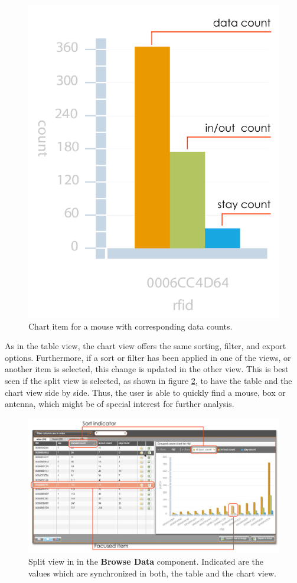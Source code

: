 \begin{figure}[!htbp]
\begin{center}
  \includegraphics[width=.33\textwidth]{assets/pdf/mouse_chart_item.pdf}
  \caption[Chart item for a mouse with corresponding data counts]{Chart item for a mouse with corresponding data counts.}
  \label{fig:mouse_chart_item}
\end{center}
\end{figure}

As in the table view, the chart view offers the same sorting, filter, and export options. Furthermore, if a sort or filter has been applied in one of the views, or another item is selected, this change is updated in the other view. This is best seen if the split view is selected, as shown in figure \ref{fig:table_chart_view}, to have the table and the chart view side by side. Thus, the user is able to quickly find a mouse, box or antenna, which might be of special interest for further analysis.

\begin{figure}[htpb]
\begin{center}
  \includegraphics[width=\textwidth]{assets/pdf/table_chart_view.pdf}
  \caption[Split view]{Split view in in the \textbf{Browse Data} component. Indicated are the values which are synchronized in both, the table and the chart view.}
  \label{fig:table_chart_view}
\end{center}
\end{figure}

